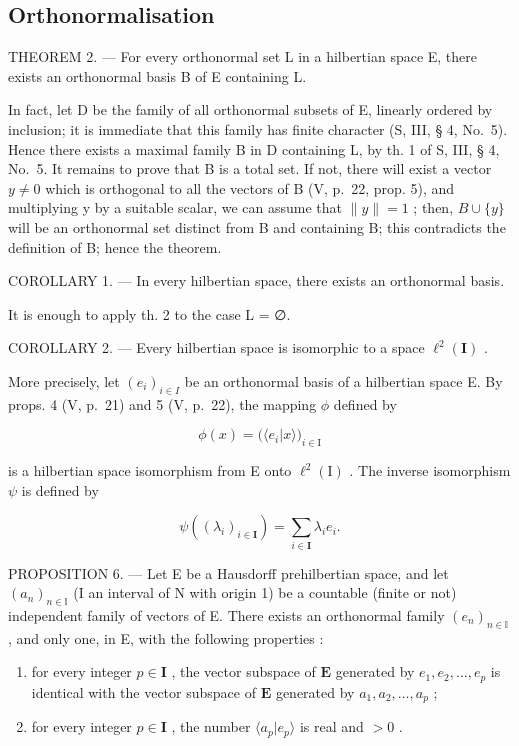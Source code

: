 \subsection{Orthonormalisation}

THEOREM 2. --- For every orthonormal set L in a hilbertian space E, there exists an orthonormal basis B of E containing L.

In fact, let D be the family of all orthonormal subsets of E, linearly ordered by inclusion; it is immediate that this family has finite character (S, III, § 4, No.~5). Hence there exists a maximal family B in D containing L, by th. 1 of S, III, § 4, No.~5. It remains to prove that B is a total set. If not, there will exist a vector \(y \neq 0\) which is orthogonal to all the vectors of B (V, p.~22, prop. 5), and multiplying y by a suitable scalar, we can assume that \(\|y\| = 1\) ; then, \(B \cup \{y\}\) will be an orthonormal set distinct from B and containing B; this contradicts the definition of B; hence the theorem.

COROLLARY 1. --- In every hilbertian space, there exists an orthonormal basis.

It is enough to apply th. 2 to the case L = ∅.

COROLLARY 2. --- Every hilbertian space is isomorphic to a space \(\ell^2 (\mathbf{I})\) .

More precisely, let \((e_{i})_{i\in I}\) be an orthonormal basis of a hilbertian space E. By props. 4 (V, p.~21) and 5 (V, p.~22), the mapping \(\phi\) defined by

\[
\phi (x) = \big (\langle e _ {i} | x \rangle \big) _ {i \in \mathrm{I}}\tag{4}
\]

is a hilbertian space isomorphism from E onto \(\ell^2 (\mathrm{I})\) . The inverse isomorphism \(\psi\) is defined by

\[
\psi ((\lambda_ {i}) _ {i \in \mathbf {I}}) = \sum_ {i \in \mathbf {I}} \lambda_ {i} e _ {i}.\tag{5}
\]

PROPOSITION 6. --- Let E be a Hausdorff prehilbertian space, and let \((a_{n})_{n\in\mathbb{I}}\) (I an interval of N with origin 1) be a countable (finite or not) independent family of vectors of E. There exists an orthonormal family \((e_{n})_{n\in\mathbb{I}}\) , and only one, in E, with the following properties :

\begin{enumerate}
\def\labelenumi{\arabic{enumi})}
\item
  for every integer \(p \in \mathbf{I}\) , the vector subspace of \(\mathbf{E}\) generated by \(e_1, e_2, \ldots, e_p\) is identical with the vector subspace of \(\mathbf{E}\) generated by \(a_1, a_2, \ldots, a_p\) ;
\item
  for every integer \(p \in \mathbf{I}\) , the number \(\langle a_p | e_p \rangle\) is real and \(> 0\) .
\end{enumerate}

